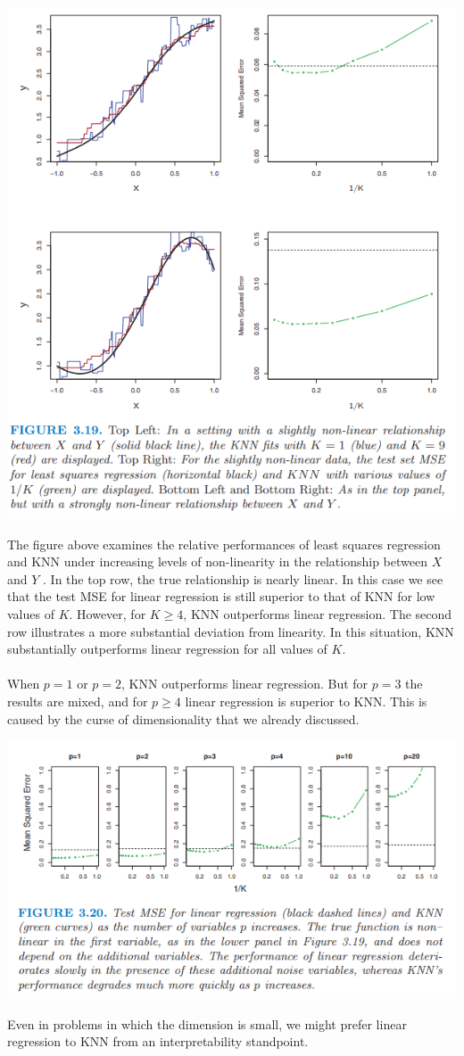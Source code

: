 \begin{center}
    \includegraphics[scale=0.8]{images/linear-reg vs knn 2.png}
\end{center}
The figure above examines the relative performances of least squares regression and KNN under increasing levels of non-linearity in the relationship
between $X$ and $Y$ . In the top row, the true relationship is nearly linear.
In this case we see that the test MSE for linear regression is still superior
to that of KNN for low values of $K$. However, for $K \geq 4$, KNN outperforms linear regression. The second row illustrates a more substantial deviation from linearity. In this situation, KNN substantially outperforms linear regression for all values of $K$.\\\\
When $p = 1$ or $p = 2$, KNN outperforms linear regression. But for $p = 3$ the results are mixed, and for $p \geq 4$ linear regression is superior to KNN. This is caused by the curse of dimensionality that we already discussed.
\begin{center}
    \includegraphics[scale=0.8]{images/curse of dim.png}
\end{center}
Even in problems in which the dimension is small, we might prefer linear regression to KNN from an interpretability standpoint.

